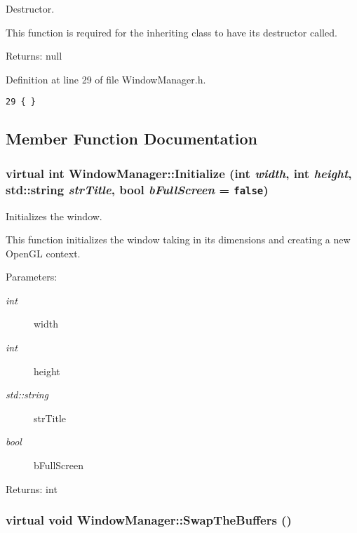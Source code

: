 Destructor. 

This function is required for the inheriting class to have its destructor called.

\begin{Desc}
\item[Returns:]null \end{Desc}


Definition at line 29 of file WindowManager.h.

\begin{Code}\begin{verbatim}29 { }
\end{verbatim}
\end{Code}




\subsection{Member Function Documentation}
\hypertarget{class_window_manager_b389ab7ab5fab8add272fb6e6d139a2a}{
\subsubsection[Initialize]{\setlength{\rightskip}{0pt plus 5cm}virtual int WindowManager::Initialize (int {\em width}, \/  int {\em height}, \/  std::string {\em strTitle}, \/  bool {\em bFullScreen} = {\tt false})}}
\label{class_window_manager_b389ab7ab5fab8add272fb6e6d139a2a}


Initializes the window. 

This function initializes the window taking in its dimensions and creating a new OpenGL context.

\begin{Desc}
\item[Parameters:]
\begin{description}
\item[{\em int}]width \item[{\em int}]height \item[{\em std::string}]strTitle \item[{\em bool}]bFullScreen \end{description}
\end{Desc}
\begin{Desc}
\item[Returns:]int \end{Desc}
\hypertarget{class_window_manager_bc3dfc535171f18eda134734e6d546ef}{
\subsubsection[SwapTheBuffers]{\setlength{\rightskip}{0pt plus 5cm}virtual void WindowManager::SwapTheBuffers ()}}
\label{class_window_manager_bc3dfc535171f18eda134734e6d546ef}


